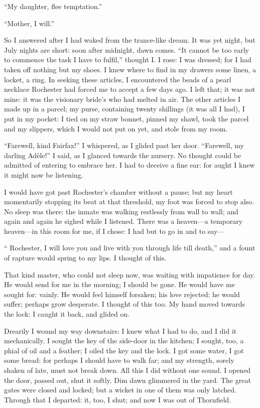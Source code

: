 \enquote{My daughter, flee temptation.}

\enquote{Mother, I will.}

So I answered after I had waked from the trance-like dream. It was yet
night, but July nights are short: soon after midnight, dawn comes. 
\enquote{It cannot be too early to commence the task I have to fulfil,}
thought I\@. I rose: I was dressed; for I had taken off nothing but my
shoes. I knew where to find in my drawers some linen, a locket, a
ring. In seeking these articles, I encountered the beads of a pearl
necklace \Mr{} Rochester had forced me to accept a few days ago. I left
that; it was not mine: it was the visionary bride's who had melted in
air. The other articles I made up in a parcel; my purse, containing
twenty shillings (it was all I had), I put in my pocket: I tied on my
straw bonnet, pinned my shawl, took the parcel and my slippers, which I
would not put on yet, and stole from my room.

\enquote{Farewell, kind \Mrs{} Fairfax!} I whispered, as I glided past her
door. \enquote{Farewell, my darling Adèle!} I said, as I glanced
towards the nursery. No thought could be admitted of entering to
embrace her. I had to deceive a fine ear: for aught I knew it might now
be listening.

I would have got past \Mr{} Rochester's chamber without a pause; but my
heart momentarily stopping its beat at that threshold, my foot was
forced to stop also. No sleep was there: the inmate was walking
restlessly from wall to wall; and again and again he sighed while I
listened. There was a heaven---a temporary heaven---in this room for
me, if I chose: I had but to go in and to say---

\enquote{\Mr{} Rochester, I will love you and live with you through life
till death,} and a fount of rapture would spring to my lips. I thought
of this.

That kind master, who could not sleep now, was waiting with impatience
for day. He would send for me in the morning; I should be gone. He
would have me sought for: vainly. He would feel himself forsaken; his
love rejected: he would suffer; perhaps grow desperate. I thought of
this too. My hand moved towards the lock: I caught it back, and glided
on.

Drearily I wound my way downstairs: I knew what I had to do, and I did
it mechanically. I sought the key of the side-door in the kitchen; I
sought, too, a phial of oil and a feather; I oiled the key and the
lock. I got some water, I got some bread: for perhaps I should have to
walk far; and my strength, sorely shaken of late, must not break down. 
All this I did without one sound. I opened the door, passed out, shut
it softly. Dim dawn glimmered in the yard. The great gates were closed
and locked; but a wicket in one of them was only latched. Through that
I departed: it, too, I shut; and now I was out of Thornfield.

